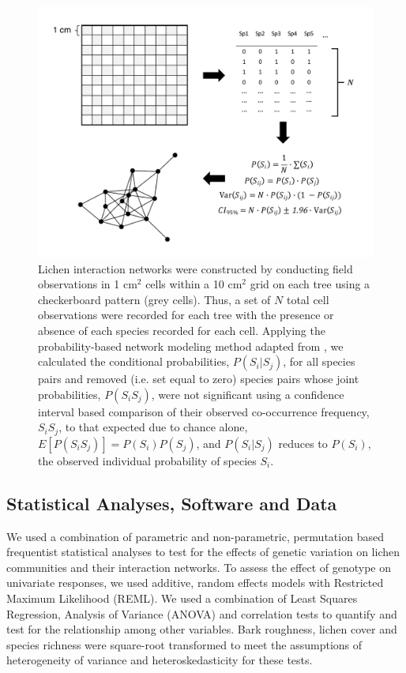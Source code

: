 \documentclass[9pt,twocolumn,twoside,lineno]{pnas-new}
\begin{document}
{\begin{figure}[ht]
\centering
\includegraphics[width=\linewidth]{lcn_araujo_method.pdf}
\caption{Lichen interaction networks were constructed by conducting
  field observations in 1 cm$^2$ cells within a 10 cm$^2$ grid on each
  tree using a checkerboard pattern (grey cells). Thus, a set of $N$
  total cell observations were recorded for each tree with the
  presence or absence of each species recorded for each cell. Applying
  the probability-based network modeling method adapted from
  \cite{Araujo2011}, we calculated the conditional probabilities,
  $P(S_i|S_j)$, for all species pairs and removed (i.e. set equal to
  zero) species pairs whose joint probabilities, $P(S_i S_j)$, were
  not significant using a confidence interval based comparison of
  their observed co-occurrence frequency, $S_iS_j$, to that expected
  due to chance alone, $E[P(S_iS_j)] = P(S_i) P(S_j)$, and
  $P(S_i|S_j)$ reduces to $P(S_i)$, the observed individual
  probability of species $S_i$.}
\label{fig:conet_method}
\end{figure}



\subsection*{Statistical Analyses, Software and Data}

We used a combination of parametric and non-parametric, permutation
based frequentist statistical analyses to test for the effects of
genetic variation on lichen communities and their interaction
networks. To assess the effect of genotype on univariate responses, we
used additive, random effects models with Restricted Maximum
Likelihood (REML). We used a combination of Least Squares Regression,
Analysis of Variance (ANOVA) and correlation tests to quantify and
test for the relationship among other variables. Bark roughness,
lichen cover and species richness were square-root transformed to meet
the assumptions of heterogeneity of variance and heteroskedasticity for
these tests. 

}
\end{document}
